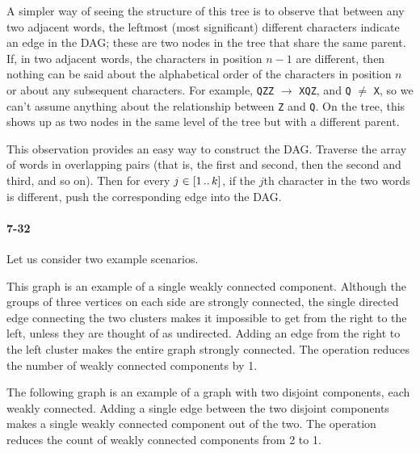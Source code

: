 \documentclass{report}
\newcommand{\li}{\lstinline}
\newcommand{\ldotsTwo}{%
 \mathinner{{\ldotp}{\ldotp}}%
}
\begin{document}
\smallskip

A simpler way of seeing the structure of this tree is to observe that between any two adjacent words, the leftmost (most significant) different characters indicate an edge in the DAG; these are two nodes in the tree that share the same parent. If, in two adjacent words, the characters in position $n-1$ are different, then nothing can be said about the alphabetical order of the characters in position $n$ or about any subsequent characters. For example, \li!QZZ! $\to$ \li!XQZ!, and \li!Q! $\ne$ \li!X!, so we can't assume anything about the relationship between \li!Z! and \li!Q!. On the tree, this shows up as two nodes in the same level of the tree but with a different parent.

This observation provides an easy way to construct the DAG. Traverse the array of words in overlapping pairs (that is, the first and second, then the second and third, and so on). Then for every $j \in [1\ldotsTwo k]$, if the $j$th character in the two words is different, push the corresponding edge into the DAG.

\paragraph{7-32} Let us consider two example scenarios.
\begin{center}
\end{center}
This graph is an example of a single weakly connected component. Although the groups of three vertices on each side are strongly connected, the single directed edge connecting the two clusters makes it impossible to get from the right to the left, unless they are thought of as undirected. Adding an edge from the right to the left cluster makes the entire graph strongly connected. The operation reduces the number of weakly connected components by 1.

The following graph is an example of a graph with two disjoint components, each weakly connected. Adding a single edge between the two disjoint components makes a single weakly connected component out of the two. The operation reduces the count of weakly connected components from 2 to 1.
\begin{center}
\end{center}
\end{document}
